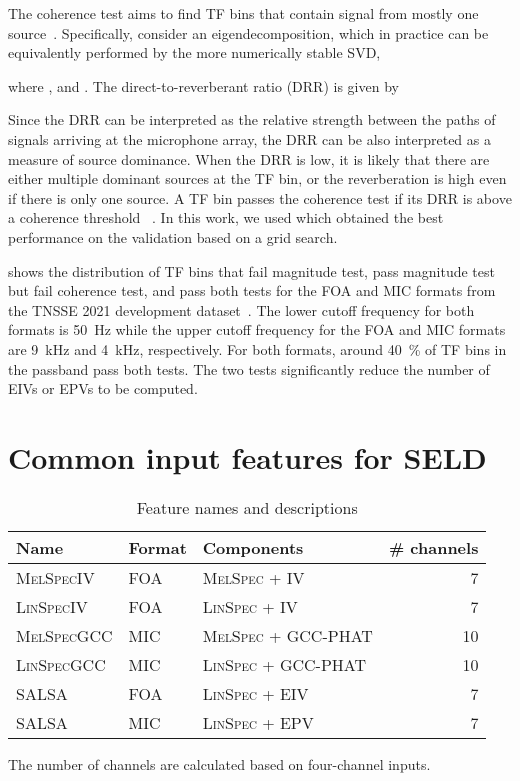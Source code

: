 \documentclass[journal]{IEEEtran}
\begin{document}
The coherence test aims to find TF bins that contain signal from mostly one source~\cite{Mohan2008LocalizationTest}. Specifically, consider an eigendecomposition, which in practice can be equivalently performed by the more numerically stable SVD,

where , and . The direct-to-reverberant ratio (DRR) is given by

Since the DRR can be interpreted as the relative strength between the paths of signals arriving at the microphone array, the DRR can be also interpreted as a measure of source dominance. When the DRR is low, it is likely that there are either multiple dominant sources at the TF bin, or the reverberation is high even if there is only one source.
A TF bin passes the coherence test if its DRR is above a coherence threshold ~\cite{Rafaely2017SpeakerStatistics}. In this work, we used  which obtained the best performance on the validation based on a grid search. 

 shows the distribution of TF bins that fail magnitude test, pass magnitude test but fail coherence test, and pass both tests for the FOA and MIC formats from the TNSSE 2021 development dataset~\cite{Politis2021}. The lower cutoff frequency for both formats is \SI{50}{\hertz} while the upper cutoff frequency for the FOA and MIC formats are \SI{9}{\kilo\hertz} and \SI{4}{\kilo\hertz}, respectively. For both formats, around \SI{40}{\percent} of TF bins in the passband pass both tests. The two tests significantly reduce the number of EIVs or EPVs to be computed.  \section{Common input features for SELD}
\label{sec:common_features}

\begin{table}[t]
    \centering
    \caption {Feature names and descriptions}  
    \label{tab:features}
    \noindent\begin{tabularx}{\columnwidth}{llXr}
    \toprule
    Name & Format &  Components & \# channels \\ 
    \midrule
    \textsc{MelSpecIV}       & FOA   & \textsc{MelSpec} + IV & \num{7} \\
    \textsc{LinSpecIV}       & FOA   & \textsc{LinSpec} + IV  & \num{7}\\
    \textsc{MelSpecGCC}       & MIC   & \textsc{MelSpec} + GCC-PHAT & \num{10}\\
    \textsc{LinSpecGCC}       & MIC   & \textsc{LinSpec} + GCC-PHAT  & \num{10}\\
    \midrule
    SALSA           & FOA   & \textsc{LinSpec} + EIV & \num{7} \\
    SALSA           & MIC   & \textsc{LinSpec} + EPV & \num{7} \\
    \bottomrule
    \end{tabularx}
    \begin{justify}
        The number of channels are calculated based on four-channel inputs.
    \end{justify}
\end{table}
\end{document}
